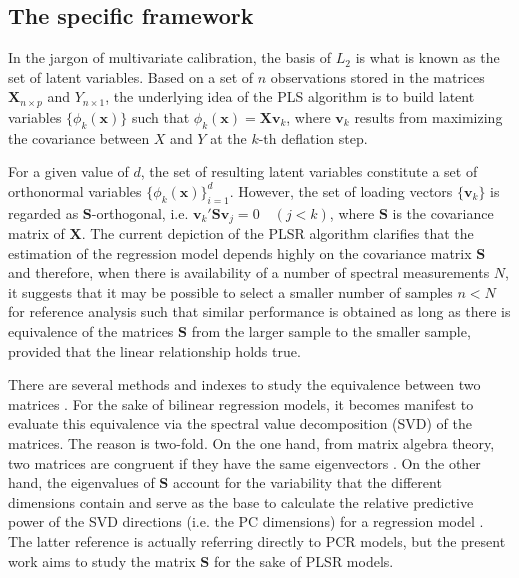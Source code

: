 \documentclass[journal=ancham,manuscript=article]{achemso}
\begin{document}
\subsection*{The specific framework}

In the jargon of multivariate calibration, the basis of $L_2$ is what is known as the set of latent variables. Based on a set of $n$ observations stored in the matrices $\mathbf{X}_{n\times p}$ and $Y_{n\times 1}$, the underlying idea of the PLS algorithm is to build latent variables $\{\phi_{k}(\mathbf{x})\}$ such that $\phi_k(\mathbf{x}) = \mathbf{Xv}_{k}$, where $\mathbf{v}_k$ results from maximizing the covariance between $X$ and $Y$ at the $k$-th deflation step. 

For a given value of $d$, the set of resulting latent variables constitute a set of orthonormal variables $\{\phi_{k}(\mathbf{x})\}_{i=1}^d$. However, the set of loading vectors $\{\mathbf{v}_k\}$ is regarded as $\mathbf{S}$-orthogonal, i.e. $\mathbf{v}_k'\mathbf{S}\mathbf{v}_j = 0 \quad (j<k)$, where $\mathbf{S}$ is the covariance matrix of $\mathbf{X}$. The current depiction of the PLSR algorithm clarifies that the estimation of the regression model depends highly on the covariance matrix $\mathbf{S}$ and therefore, when there is availability of a number of spectral measurements $N$, it suggests that it may be possible to select a smaller number of samples $n<N$ for reference analysis such that similar performance is obtained as long as there is equivalence of the matrices $\mathbf{S}$ from the larger sample to the smaller sample, provided that the linear relationship holds true. 

There are several methods and indexes to study the equivalence between two matrices \cite{Tomic2013}. For the sake of bilinear regression models, it becomes manifest to evaluate this equivalence via the spectral value decomposition (SVD) of the matrices. The reason is two-fold. On the one hand, from matrix algebra theory, two matrices are congruent if they have the same eigenvectors
\cite{Horn1985}. On the other hand, the eigenvalues of $\mathbf{S}$ account for the variability that the different dimensions contain and serve as the base to calculate the relative predictive power of the SVD directions (i.e. the PC dimensions) for a regression model \cite{Artemiou2013}. The latter reference is actually referring directly to PCR models, but the present work aims to study the matrix $\mathbf{S}$ for the sake of PLSR models.

\end{document}
